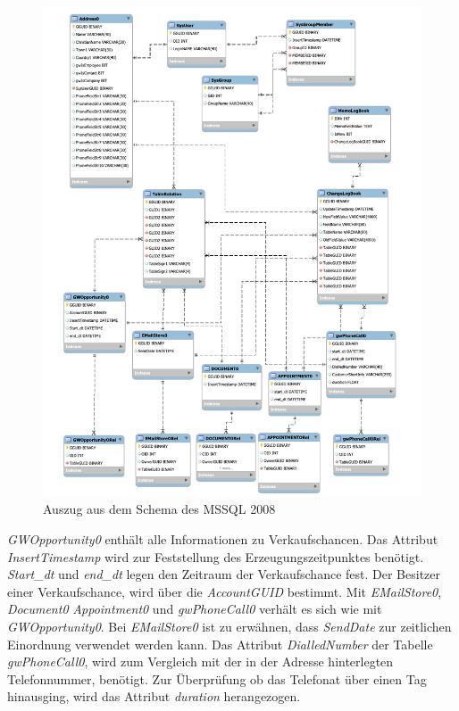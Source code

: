 \begin{figure}[H]
	\centering
  \includegraphics[width=1.0\textwidth]{pics/schema_alt.pdf}
	\caption{Auszug aus dem Schema des MSSQL 2008}
	\label{gw_schema_alt}
\end{figure}

\textit{GWOpportunity0} enthält alle Informationen zu Verkaufschancen. Das Attribut \textit{InsertTimestamp} wird zur Feststellung des Erzeugungszeitpunktes benötigt. \textit{Start\_dt} und \textit{end\_dt} legen den Zeitraum der Verkaufschance fest. Der Besitzer einer Verkaufschance, wird über die \textit{AccountGUID} bestimmt. Mit \textit{EMailStore0}, \textit{Document0} \textit{Appointment0} und \textit{gwPhoneCall0} verhält es sich wie mit \textit{GWOpportunity0}. Bei \textit{EMailStore0} ist zu erwähnen, dass \textit{SendDate} zur zeitlichen Einordnung verwendet werden kann. Das Attribut \textit{DialledNumber} der Tabelle \textit{gwPhoneCall0}, wird zum Vergleich  mit der in der Adresse hinterlegten Telefonnummer, benötigt. Zur Überprüfung ob das Telefonat über einen Tag hinausging, wird das Attribut \textit{duration} herangezogen.

